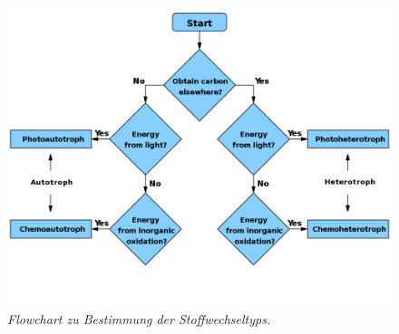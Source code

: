 \begin{enumerate}
	\begin{figure}[ht!]
	\leavevmode
	\begin{center}
		\includegraphics[scale=0.87]{./pictures/troph_flowchart}
	\end{center}
	\caption{\slshape{Flowchart zu Bestimmung der Stoffwechseltyps.}}
	\label{fig:troph_flow}
	\end{figure}

\end{enumerate}

